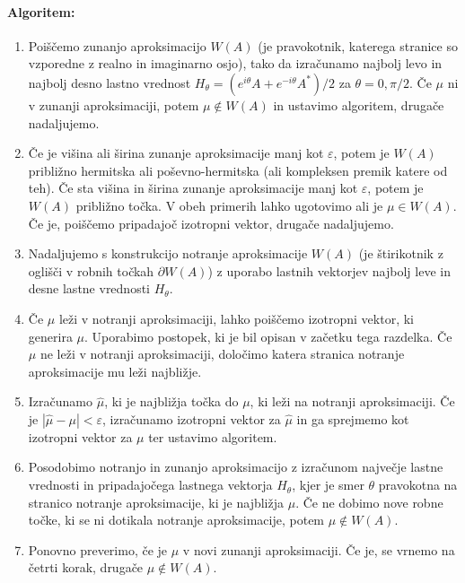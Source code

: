 \documentclass[12pt,a4paper]{amsart}
\theoremstyle{definition}
\theoremstyle{plain}
\newcommand{\abs}[1]{ \left\lvert#1\right\rvert}
\begin{document}
\paragraph{Algoritem:}
\begin{enumerate}[1.]
\item Poiščemo zunanjo aproksimacijo $W(A)$ (je pravokotnik, katerega stranice so vzporedne z realno in imaginarno osjo), tako da izračunamo najbolj levo in najbolj desno lastno vrednost $H_\theta =(e^{i\theta}A+e^{-i\theta}A^\ast)/2$ za $\theta =0, \pi/2$. %
Če $\mu$ ni v zunanji aproksimaciji, potem $\mu \not \in W(A)$ in ustavimo algoritem, drugače nadaljujemo.
\item Če je višina ali širina zunanje aproksimacije manj kot $\varepsilon$, potem je $W(A)$ približno hermitska ali poševno-hermitska (ali kompleksen premik katere od teh). Če sta višina in širina zunanje aproksimacije manj kot $\varepsilon$, potem je $W(A)$ približno točka. V obeh primerih lahko ugotovimo ali je $\mu \in W(A)$. Če je, poiščemo pripadajoč izotropni vektor, drugače nadaljujemo.
\item Nadaljujemo s konstrukcijo notranje aproksimacije $W(A)$ (je štirikotnik z oglišči v robnih točkah $\partial W(A)$) z uporabo lastnih vektorjev najbolj leve in desne lastne vrednosti $H_{\theta}$.%
\item  Če $\mu$ leži v notranji aproksimaciji, lahko poiščemo izotropni vektor, ki generira $\mu$. Uporabimo postopek, ki je bil opisan v začetku tega razdelka. %
Če $\mu$ ne leži v notranji aproksimaciji, določimo katera stranica notranje aproksimacije mu leži najbližje.
\item  Izračunamo $\hat{\mu}$, ki je najbližja točka do $\mu$, ki leži na notranji aproksimaciji. Če je $\abs{\hat{\mu}-\mu}<\varepsilon$, izračunamo izotropni vektor za $\hat{\mu}$ in ga sprejmemo kot izotropni vektor za $\mu$ ter ustavimo algoritem.
\item Posodobimo notranjo in zunanjo aproksimacijo z izračunom največje lastne vrednosti in pripadajočega lastnega vektorja $H_{\theta}$, kjer je smer $\theta$ pravokotna na stranico notranje aproksimacije, ki je najbližja $\mu$. Če ne dobimo nove robne točke, ki se ni dotikala notranje aproksimacije, potem $\mu \not \in W(A)$. 
\item Ponovno preverimo, če je $\mu$  v novi zunanji aproksimaciji. Če je, se vrnemo na četrti korak, drugače $\mu \not \in W(A)$. 
\end{enumerate}
\end{document}
